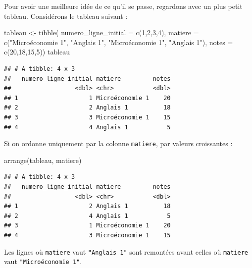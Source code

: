 \documentclass[
  11pt,
]{book}
\newenvironment{Shaded}{\begin{snugshade}}{\end{snugshade}}
\newcommand{\AttributeTok}[1]{\textcolor[rgb]{0.77,0.63,0.00}{#1}}
\newcommand{\DecValTok}[1]{\textcolor[rgb]{0.00,0.00,0.81}{#1}}
\newcommand{\FunctionTok}[1]{\textcolor[rgb]{0.00,0.00,0.00}{#1}}
\newcommand{\NormalTok}[1]{#1}
\newcommand{\OtherTok}[1]{\textcolor[rgb]{0.56,0.35,0.01}{#1}}
\newcommand{\StringTok}[1]{\textcolor[rgb]{0.31,0.60,0.02}{#1}}
\numberwithin{equation}{section}
\numberwithin{countremarque}{section}
\newenvironment{notebox}{
  \begin{tcolorbox}[breakable, colback=jaune,coltext=black,
                  colframe=grisfonce]}
 {\end{tcolorbox}}
\begin{document}
\begin{notebox}

Pour avoir une meilleure idée de ce qu'il se passe, regardons avec un plus petit tableau. Considérons le tableau suivant :

\begin{Shaded}
\begin{Highlighting}[]
\NormalTok{tableau }\OtherTok{\textless{}{-}} 
  \FunctionTok{tibble}\NormalTok{(}
    \AttributeTok{numero\_ligne\_initial =} \FunctionTok{c}\NormalTok{(}\DecValTok{1}\NormalTok{,}\DecValTok{2}\NormalTok{,}\DecValTok{3}\NormalTok{,}\DecValTok{4}\NormalTok{),}
    \AttributeTok{matiere =} \FunctionTok{c}\NormalTok{(}\StringTok{"Microéconomie 1"}\NormalTok{, }\StringTok{"Anglais 1"}\NormalTok{,}
                \StringTok{"Microéconomie 1"}\NormalTok{, }\StringTok{"Anglais 1"}\NormalTok{),}
    \AttributeTok{notes =} \FunctionTok{c}\NormalTok{(}\DecValTok{20}\NormalTok{,}\DecValTok{18}\NormalTok{,}\DecValTok{15}\NormalTok{,}\DecValTok{5}\NormalTok{))}
\NormalTok{tableau}
\end{Highlighting}
\end{Shaded}

\begin{lstlisting}
## # A tibble: 4 x 3
##   numero_ligne_initial matiere         notes
##                  <dbl> <chr>           <dbl>
## 1                    1 Microéconomie 1    20
## 2                    2 Anglais 1          18
## 3                    3 Microéconomie 1    15
## 4                    4 Anglais 1           5
\end{lstlisting}

Si on ordonne uniquement par la colonne \texttt{matiere}, par valeurs croissantes :

\begin{Shaded}
\begin{Highlighting}[]
\FunctionTok{arrange}\NormalTok{(tableau, matiere)}
\end{Highlighting}
\end{Shaded}

\begin{lstlisting}
## # A tibble: 4 x 3
##   numero_ligne_initial matiere         notes
##                  <dbl> <chr>           <dbl>
## 1                    2 Anglais 1          18
## 2                    4 Anglais 1           5
## 3                    1 Microéconomie 1    20
## 4                    3 Microéconomie 1    15
\end{lstlisting}

Les lignes où \texttt{matiere} vaut \texttt{"Anglais\ 1"} sont remontées avant celles où \texttt{matiere} vaut \texttt{"Microéconomie\ 1"}.


\end{notebox}
\end{document}
